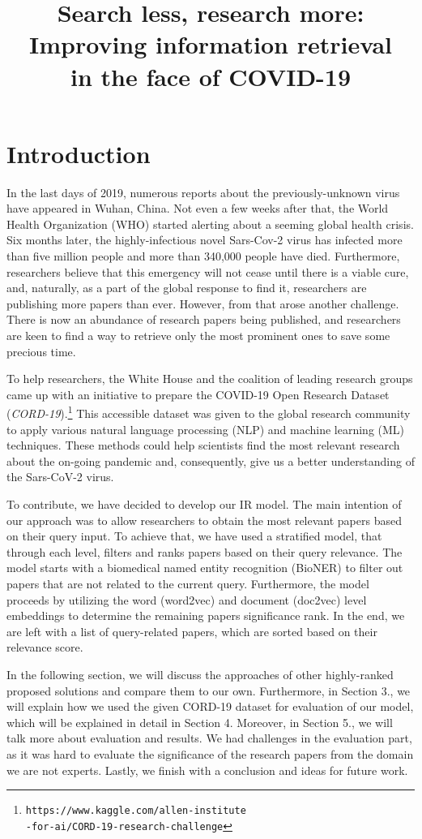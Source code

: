 \documentclass[10pt, a4paper]{article}
\title{
	Search less, research more: Improving information retrieval\\
	in the face of COVID-19\\
}
\begin{document}
	
	\maketitleabstract
	
	\section{Introduction}
	
	In the last days of 2019, numerous reports about the previously-unknown virus have appeared in Wuhan, China. Not even a few weeks after that, the World Health Organization (WHO) started alerting about a seeming global health crisis. Six months later, the highly-infectious novel Sars-Cov-2 virus has infected more than five million people and more than 340,000 people have died. Furthermore, researchers believe that this emergency will not cease until there is a viable cure, and, naturally, as a part of the global response to find it, researchers are publishing more papers than ever. However, from that arose another challenge. There is now an abundance of research papers being published, and researchers are keen to find a way to retrieve only the most prominent ones to save some precious time.

	To help researchers, the White House and the coalition of leading research groups came up with an initiative to prepare the COVID-19 Open Research Dataset (\emph{CORD-19}).\footnote{\texttt{https://www.kaggle.com/allen-institute\\-for-ai/CORD-19-research-challenge}} This accessible dataset was given to the global research community to apply various natural language processing (NLP) and machine learning (ML) techniques. These methods could help scientists ﬁnd the most relevant research about the on-going pandemic and, consequently, give us a better understanding of the Sars-CoV-2 virus.

	To contribute, we have decided to develop our IR model. The main intention of our approach was to allow researchers to obtain the most relevant papers based on their query input. To achieve that, we have used a stratified model, that through each level, filters and ranks papers based on their query relevance.  The model starts with a biomedical named entity recognition (BioNER) to filter out papers that are not related to the current query. Furthermore, the model proceeds by utilizing the word (word2vec) and document (doc2vec) level embeddings to determine the remaining papers significance rank. In the end, we are left with a list of query-related papers, which are sorted based on their relevance score.

	In the following section, we will discuss the approaches of other highly-ranked proposed solutions and compare them to our own. Furthermore, in Section 3., we will explain how we used the given CORD-19 dataset for evaluation of our model, which will be explained in detail in Section 4. Moreover, in Section 5., we will talk more about evaluation and results.  We had challenges in the evaluation part, as it was hard to evaluate the significance of the research papers from the domain we are not experts. Lastly, we finish with a conclusion and ideas for future work.
\end{document}
